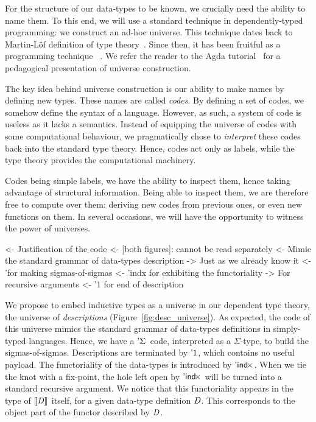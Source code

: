 For the structure of our data-types to be known, we crucially need the
ability to name them.  To this
end, we will use a standard technique in dependently-typed programming: we
construct an ad-hoc universe. This technique dates back to Martin-L\"of
definition of type theory~\cite{martin-lof:itt}. Since then, it has been
fruitful as a programming 
technique~\cite{benke:universe-generic-prog, oury:power-of-pi}
. 
We refer the reader to the Agda tutorial~\cite{norell:agda-tutorial} for a
pedagogical presentation of universe construction. 


The key idea behind universe construction is our ability to make names
by defining new types. These names are called \emph{codes}. By
defining a set of codes, we somehow define the syntax of a
language. However, as such, a system of code is useless as it lacks a
semantics. Instead of equipping the universe of codes with some
computational behaviour, we pragmatically chose to \emph{interpret}
these codes back into the standard type theory. Hence, codes act only
as labels, while the type theory provides the computational
machinery. 

Codes being simple labels, we have the ability to inspect them, hence
taking advantage of structural information. Being able to inspect
them, we are therefore free to compute over them: deriving new codes
from previous ones, or even new functions on them. In several
occasions, we will have the opportunity to witness the power of
universes.

\begin{wstructure}
<- Justification of the code 
    <- [both figures]: cannot be read separately
    <- Mimic the standard grammar of data-types description
        -> Just as we already know it
        <- '\Sigma for making sigmas-of-sigmas
        <- 'indx for exhibiting the functoriality
            -> For recursive arguments
        <- '1 for end of description
\end{wstructure}

We propose to embed inductive types as a universe in our dependent
type theory, the universe of \emph{descriptions}
(Figure~\ref{fig:desc_universe}). As expected, the code of this
universe mimics the standard grammar of data-types definitions in
simply-typed languages. Hence, we have a $\DSigma{\!}{\!}$ code,
interpreted as a $\Sigma$-type, to build the
sigmas-of-sigmas. Descriptions are terminated by $\DUnit$, which
contains no useful payload. The functoriality of the data-types is
introduced by $\DIndx{\!}$. When we tie the knot with a fix-point, the
hole left open by $\DIndx{\!}$ will be turned into a standard
recursive argument. We notice that this functoriality appears in the
type of $\descop{\V{D}}{\!}$ itself, for a given data-type definition
$\V{D}$. This corresponds to the object part of the functor described
by $\V{D}$.

